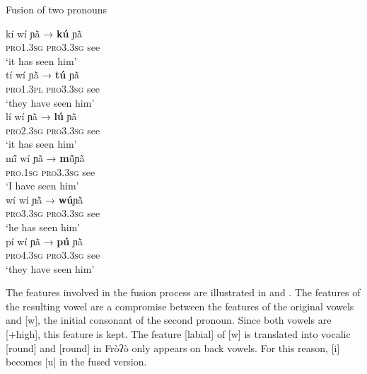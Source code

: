 \documentclass[output=paper]{langscibook}
\begin{document}
   
    \begin{exe}
    \ex Fusion of two pronouns \label{ex:traore:33}\\
    \begin{xlist} 
        \ex \gll kí              wí                ɲã̀                   →            \textbf{kú}      ɲã̀ \\  
              \textsc{pro1.3sg}     \textsc{pro3.3sg}      see           {}         {}          {}\\
              \trans `it has seen him'\\
         \ex \gll  tí               wí                ɲã̀                 →            \textbf{tú}    ɲã̀  \\ 
          \textsc{pro1.3pl}    \textsc{pro3.3sg}      see                   {}          {} {}\\
          \trans `they have seen him'\\
        \ex \gll  lí                wí                ɲã̀                  →            \textbf{lú}    ɲã̀ \\
              \textsc{pro2.3sg}    \textsc{pro3.3sg}      see                {}         {}          {}\\
             \trans `it has seen him'\\
         \ex \gll  mĩ́               wí                ɲã̀                     →            \textbf{m}ṹɲã̀ \\
               \textsc{pro.1sg}        \textsc{pro3.3sg}      see                 {}            {}          {}\\
               \trans `I have seen him'\\
        \ex \gll wí              wí                ɲã̀                 →            \textbf{wú}ɲã̀\\
            \textsc{pro3.3sg}     \textsc{pro3.3sg}      see          {}        {}      {}\\
            \trans `he has seen him'\\
        \ex \gll pí              wí                ɲã̀                 →            \textbf{pú}    ɲã̀\\
        \textsc{pro4.3sg}    \textsc{pro3.3sg}      see              {}             {}          {}\\
        \trans `they have seen him'\\
        \end{xlist}
 \end{exe}

The features involved in the fusion process are illustrated in  and . The features of the resulting vowel are a compromise between the features of the original vowels and [w], the initial consonant of the second pronoun. Since both vowels are [+high], this feature is kept. The feature [labial] of [w] is translated into vocalic [round] and [round] in Fròʔò only appears on back vowels. For this reason, [i] becomes [u] in the fused version.
\end{document}

